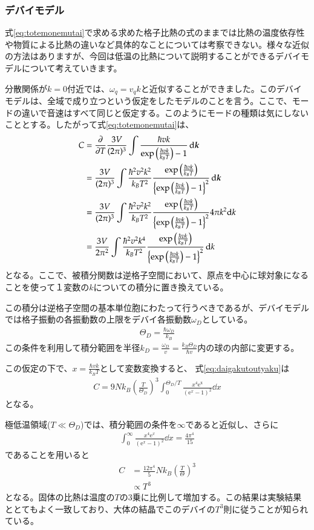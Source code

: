 \documentclass[10pt,b5paper,papersize,dvipdfmx]{jsbook}
\begin{document}
\subsubsection*{デバイモデル}
式\ref{eq:totemonemutai}で求める求めた格子比熱の式のままでは比熱の温度依存性や物質による比熱の違いなど具体的なことについては考察できない。様々な近似の方法はありますが、今回は低温の比熱について説明することができるデバイモデルについて考えていきます。\par
分散関係が$k = 0$付近では、$\omega_q = v_q k$と近似することができました。このデバイモデルは、全域で成り立つという仮定をしたモデルのことを言う。ここで、モードの違いで音速はすべて同じと仮定する。このようにモードの種類は気にしないこととする。したがって式\ref{eq:totemonemutai}は、
\begin{align}
  C &= \pdv{T} \frac{3V}{(2\pi)^3} \int\frac{\hbar v k}{\exp \left(\frac{\hbar v k}{k_BT}\right)-1 }\dd{\bm{k}}\\
  & = \frac{3V}{(2\pi)^3} \int \frac{\hbar^2 v^2 k ^2}{k_B T ^2}  \frac{\exp \left(\frac{\hbar v k}{k_BT}\right)}{\left\{\exp \left(\frac{\hbar v k}{k_BT}\right)-1 \right\}^2}\dd{\bm{k}}\\
  &= \frac{3V}{(2\pi)^3} \int \frac{\hbar^2 v^2 k ^2}{k_B T ^2}  \frac{\exp \left(\frac{\hbar v k}{k_BT}\right)}{\left\{\exp \left(\frac{\hbar v k}{k_BT}\right)-1 \right\}^2} 4 \pi k^2 \dd k\\
  &= \frac{3V}{2\pi^2} \int \frac{\hbar^2 v^2 k ^4}{k_B T ^2}  \frac{\exp \left(\frac{\hbar v k}{k_BT}\right)}{\left\{\exp \left(\frac{\hbar v k}{k_BT}\right)-1 \right\}^2}  \dd {k}
  \label{eq:daigakutoutyaku}
\end{align}
となる。ここで、被積分関数は逆格子空間において、原点を中心に球対象になることを使って１変数の$k$についての積分に置き換えている。\par
この積分は逆格子空間の基本単位胞にわたって行うべきであるが、デバイモデルでは格子振動の各振動数の上限をデバイ各振動数$\omega_D$としている。
\begin{align}
  \Theta_D = \frac{\hbar \omega_D}{k_B}
\end{align}
この条件を利用して積分範囲を半径$k_D=\frac{\omega_D}{v} = \frac{k_B\Theta_D}{\hbar v}$内の球の内部に変更する。\par
この仮定の下で、$x = \frac{\hbar v k}{k_B T}$として変数変換すると、 式\ref{eq:daigakutoutyaku}は
\begin{align}
  C = 9Nk_B\left(\frac{T}{\Theta_D}\right)^3\int_0^{\Theta_D/T}\frac{x^4\mathrm{e^x}}{(\mathrm{e}^x -1)^2}\dd{x}
\end{align}
となる。\par
極低温領域($T \ll \Theta_D$)では、積分範囲の条件を$\infty$であると近似し、さらに
\begin{align}
  \int_0^\infty \frac{x^4 \mathrm{e}^x}{(\mathrm{e}^x-1)^2}\dd{x} = \frac{4\pi^4}{15}
\end{align}
であることを用いると
\begin{align}
  C &= \frac{12\pi^4}{5}Nk_B\left(\frac{T}{\Theta}\right)^3 \\
  &\propto T^3  
\end{align}
となる。固体の比熱は温度の$T$の3乗に比例して増加する。この結果は実験結果ととてもよく一致しており、大体の結晶でこのデバイの$T^3$則に従うことが知られている。
\end{document}
